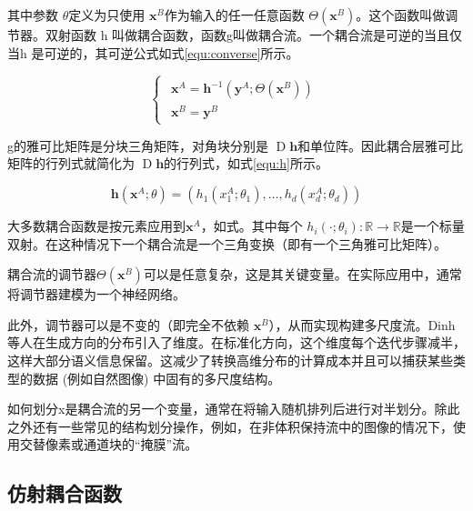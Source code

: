 其中参数 $\theta$定义为只使用 $\mathbf{x}^{B}$作为输入的任一任意函数 $\Theta\left(\mathbf{x}^{B}\right)$。这个函数叫做调节器。双射函数 h 叫做耦合函数，函数g叫做耦合流。一个耦合流是可逆的当且仅当h 是可逆的，其可逆公式如式\ref{equ:converse}所示。

\begin{equation}\label{equ:converse}
    \left\{\begin{matrix}
        \begin{array}{l}\mathbf{x}^{A}=\mathbf{h}^{-1}\left(\mathbf{y}^{A} ; \Theta\left(\mathbf{x}^{B}\right)\right) \\\mathbf{x}^{B}=\mathbf{y}^{B}\end{array}
        \end{matrix}\right.
\end{equation}

g的雅可比矩阵是分块三角矩阵，对角块分别是 $\operatorname{D}\mathbf{h}$和单位阵。因此耦合层雅可比矩阵的行列式就简化为 $\operatorname{D}\mathbf{h}$的行列式，如式\ref{equ:h}所示。

\begin{equation}\label{equ:h}
    \mathbf{h}\left(\mathbf{x}^{A} ; \theta\right)=\left(h_{1}\left(x_{1}^{A} ; \theta_{1}\right), \ldots, h_{d}\left(x_{d}^{A} ; \theta_{d}\right)\right)
\end{equation}


大多数耦合函数是按元素应用到$\mathbf{x}^{A}$，如式。其中每个 $h_{i}\left(\cdot ; \theta_{i}\right): \mathbb{R} \rightarrow \mathbb{R}$是一个标量双射。在这种情况下一个耦合流是一个三角变换（即有一个三角雅可比矩阵）。

耦合流的调节器$\Theta\left(\mathbf{x}^{B}\right)$可以是任意复杂，这是其关键变量。在实际应用中，通常将调节器建模为一个神经网络。

此外，调节器可以是不变的（即完全不依赖 $\mathbf{x}^{B}$），从而实现构建多尺度流。Dinh等人\cite{lelanPerfectDensityModels2021}在生成方向的分布引入了维度。在标准化方向，这个维度每个迭代步骤减半，这样大部分语义信息保留。这减少了转换高维分布的计算成本并且可以捕获某些类型的数据 (例如自然图像) 中固有的多尺度结构。

如何划分x是耦合流的另一个变量，通常在将输入随机排列后进行对半划分。除此之外还有一些常见的结构划分操作，例如，在非体积保持流中的图像的情况下，使用交替像素或通道块的“掩膜”流。

\subsection{仿射耦合函数} 

